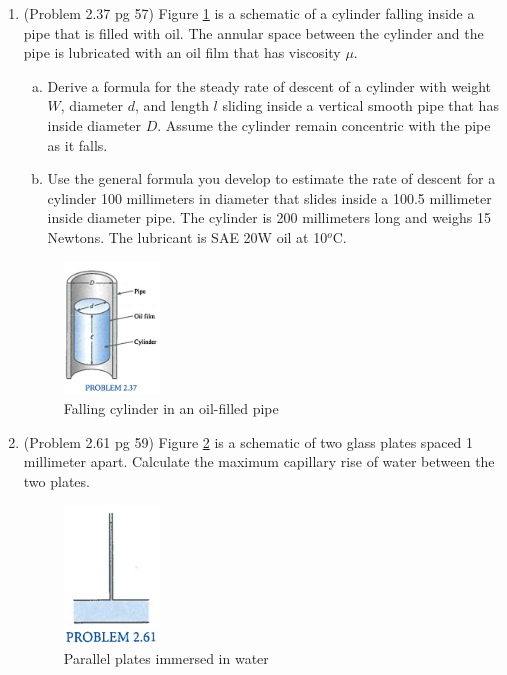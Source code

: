 \documentclass[12pt]{article}
\begin{document}
\begin{enumerate}
\item (Problem 2.37 pg 57)
Figure \ref{fig:FallingCylinderViscosity} is a schematic of a cylinder falling inside a pipe that is filled with oil.
The annular space between the cylinder and the pipe is lubricated with an oil film that has viscosity $\mu$.
\begin{enumerate}[a)]
\item Derive a formula for the steady rate of descent of a cylinder with weight $W$, diameter $d$, and length $l$ sliding inside a vertical smooth pipe that has inside diameter $D$.
Assume the cylinder remain concentric with the pipe as it falls.
\item Use the general formula you develop to estimate the rate of descent for a cylinder 100 millimeters in diameter that slides inside a 100.5 millimeter inside diameter pipe. 
The cylinder is 200 millimeters long and weighs 15 Newtons.  The lubricant is SAE 20W oil at 10$^o$C.
\end{enumerate}
\begin{figure}[htbp] %
   \centering
   \includegraphics[width=1in]{FallingCylinderViscosity.jpg} 
   \caption{Falling cylinder in an oil-filled pipe}
   \label{fig:FallingCylinderViscosity}
\end{figure}
\clearpage

\item (Problem 2.61 pg 59)
Figure \ref{fig:ParallelPlates} is a schematic of two glass plates spaced 1 millimeter apart.  
Calculate the maximum capillary rise of water between the two plates. 
\begin{figure}[htbp] %
   \centering
   \includegraphics[width=1in]{ParallelPlates.jpg} 
   \caption{Parallel plates immersed in water}
   \label{fig:ParallelPlates}
\end{figure}

\end{enumerate}
\end{document}
